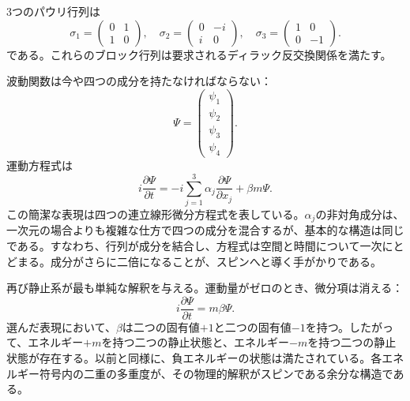 3つのパウリ行列は
\begin{equation}
\sigma_1=
\begin{pmatrix}
0&1\\
1&0
\end{pmatrix},
\quad
\sigma_2=
\begin{pmatrix}
0&-i\\
i&0
\end{pmatrix},
\quad
\sigma_3=
\begin{pmatrix}
1&0\\
0&-1
\end{pmatrix}.
\end{equation}
である。これらのブロック行列は要求されるディラック反交換関係を満たす。

波動関数は今や四つの成分を持たなければならない：
\begin{equation}
\Psi=
\begin{pmatrix}
\psi_1\\
\psi_2\\
\psi_3\\
\psi_4
\end{pmatrix}.
\end{equation}
運動方程式は
\begin{equation}
i\frac{\partial\Psi}{\partial t}
=
-i\sum_{j=1}^{3}\alpha_j
\frac{\partial\Psi}{\partial x_j}
+\beta m\Psi.
\end{equation}
この簡潔な表現は四つの連立線形微分方程式を表している。\(\alpha_j\)の非対角成分は、一次元の場合よりも複雑な仕方で四つの成分を混合するが、基本的な構造は同じである。すなわち、行列が成分を結合し、方程式は空間と時間について一次にとどまる。成分がさらに二倍になることが、スピンへと導く手がかりである。

\begin{classroomqa}
\end{classroomqa}

再び静止系が最も単純な解釈を与える。運動量がゼロのとき、微分項は消える：
\begin{equation}
i\frac{\partial\Psi}{\partial t}=m\beta\Psi.
\end{equation}
選んだ表現において、\(\beta\)は二つの固有値\(+1\)と二つの固有値\(-1\)を持つ。したがって、エネルギー\(+m\)を持つ二つの静止状態と、エネルギー\(-m\)を持つ二つの静止状態が存在する。以前と同様に、負エネルギーの状態は満たされている。各エネルギー符号内の二重の多重度が、その物理的解釈がスピンである余分な構造である。

